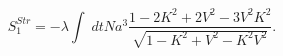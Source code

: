 \begin{equation}\label{stractn}
S^{Str}_1=-\lambda \int \; dt N a^3
\frac{1-2K^2+2V^2-3V^2K^2}{\sqrt{1- K^2+ V^2-  K^2V^2}}.
\end{equation}

